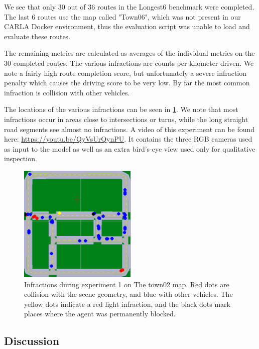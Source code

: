 We see that only 30 out of 36 routes in the Longest6 benchmark were completed.
The last 6 routes use the map called "Town06",
which was not present in our CARLA Docker environment,
thus the evaluation script was unable to load and evaluate these routes.

The remaining metrics are calculated as averages of the 
individual metrics on the 30 completed routes.
The various infractions are counts per kilometer driven.
We note a fairly high route completion score,
but unfortunately a severe infraction penalty
which causes the driving score to be very low.
By far the most common infraction is collision with other vehicles.

The locations of the various infractions can be seen in \cref{fig:exp1:town02}.
We note that most infractions occur in areas close to intersections or turns,
while the long straight road segments see almost no infractions.
A video of this experiment can be found here: \url{https://youtu.be/QyVsUrQynPU}. It contains the three
RGB cameras used as input to the model as well as an extra bird's-eye view used 
only for qualitative inspection.

\begin{figure}
    \centering
    \includegraphics[width=0.5\textwidth]{figures/results/exp1-town02.png}
    \caption{Infractions during experiment 1 on The town02 map.
    Red dots are collision with the scene geometry,
    and blue with other vehicles.
    The yellow dots indicate a red light infraction,
    and the black dots mark places where the agent was permanently blocked.}
    \label{fig:exp1:town02}
\end{figure}


\subsection{Discussion}

